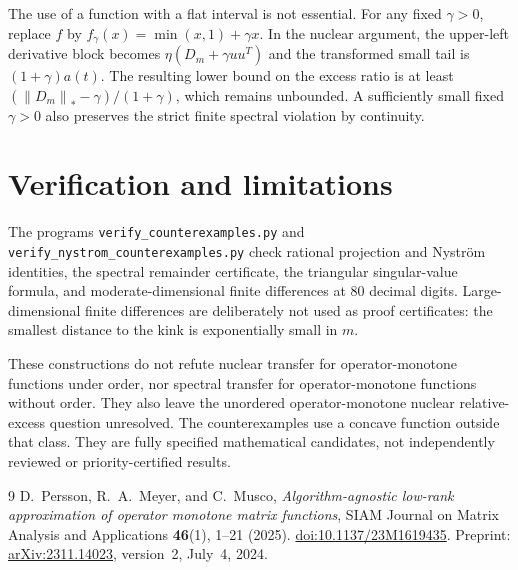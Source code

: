 \documentclass[11pt]{article}
\theoremstyle{definition}
\newcommand{\norm}[1]{\left\lVert#1\right\rVert}
\begin{document}
The use of a function with a flat interval is not essential. For any fixed $\gamma>0$, replace $f$ by $f_\gamma(x)=\min(x,1)+\gamma x$. In the nuclear argument, the upper-left derivative block becomes $\eta(D_m+\gamma uu^T)$ and the transformed small tail is $(1+\gamma)a(t)$. The resulting lower bound on the excess ratio is at least $(\norm{D_m}_*-\gamma)/(1+\gamma)$, which remains unbounded. A sufficiently small fixed $\gamma>0$ also preserves the strict finite spectral violation by continuity.

\section{Verification and limitations}
The programs \texttt{verify\_counterexamples.py} and
\texttt{verify\_nystrom\_counterexamples.py} check rational projection and Nystr\"om identities, the spectral remainder certificate, the triangular singular-value formula, and moderate-dimensional finite differences at 80 decimal digits. Large-dimensional finite differences are deliberately not used as proof certificates: the smallest distance to the kink is exponentially small in $m$.

These constructions do not refute nuclear transfer for operator-monotone functions under order, nor spectral transfer for operator-monotone functions without order. They also leave the unordered operator-monotone nuclear relative-excess question unresolved. The counterexamples use a concave function outside that class. They are fully specified mathematical candidates, not independently reviewed or priority-certified results.

\begin{thebibliography}{9}
D.~Persson, R.~A.~Meyer, and C.~Musco,
\emph{Algorithm-agnostic low-rank approximation of operator monotone matrix functions},
SIAM Journal on Matrix Analysis and Applications \textbf{46}(1), 1--21 (2025).
\href{https://doi.org/10.1137/23M1619435}{doi:10.1137/23M1619435}.
Preprint: \href{https://arxiv.org/abs/2311.14023}{arXiv:2311.14023}, version~2, July~4, 2024.
\end{thebibliography}
\end{document}
